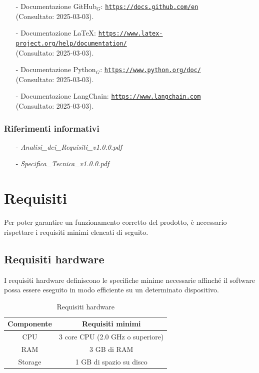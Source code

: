 \documentclass[10pt]{article}
\begin{document}
\begin{justify}
\begin{itemize}
    \item[-] Documentazione GitHub$_G$: \textcolor{blue}{\texttt{\url{https://docs.github.com/en}}} \\
    (Consultato: 2025-03-03).
    
    \item[-] Documentazione \LaTeX: \textcolor{blue}{\texttt{\url{https://www.latex-project.org/help/documentation/}}} \\
    (Consultato: 2025-03-03).
    
    \item[-] Documentazione Python$_G$: \textcolor{blue}{\texttt{\url{https://www.python.org/doc/}}} \\
    (Consultato: 2025-03-03).
    
    \item[-] Documentazione LangChain: \textcolor{blue}{\texttt{\url{https://www.langchain.com}}} \\
    (Consultato: 2025-03-03).
\end{itemize}

\subsubsection{Riferimenti informativi}
\begin{itemize}
    \item[-] \textit{Analisi\_dei\_Requisiti\_v1.0.0.pdf}
    \item[-] \textit{Specifica\_Tecnica\_v1.0.0.pdf}
\end{itemize}


\newpage


\section{Requisiti}
\label{sec:requisiti}
Per poter garantire un funzionamento corretto del prodotto, è necessario rispettare i requisiti minimi elencati di seguito.

\subsection{Requisiti hardware}
I requisiti hardware definiscono le specifiche minime necessarie affinché il software possa essere eseguito in modo efficiente su un determinato dispositivo.

\begin{table}[H]
    \centering
    \begin{tabular}{|c|c|}
        \hline
        \rowcolor{gray!25}
        Componente & Requisiti minimi \\
        \hline
        CPU & 3 core CPU (2.0 GHz o superiore)\\
        \hline
        RAM & 3 GB di RAM\\
        \hline
        Storage & 1 GB di spazio su disco\\
        \hline
    \end{tabular}
    \caption{Requisiti hardware}
    \label{tab:requisiti_hardware}
\end{table}


\end{justify}
\end{document}
